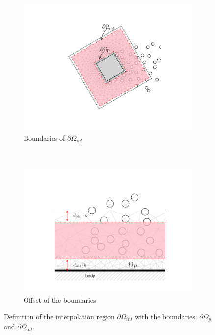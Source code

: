 	\begin{figure}[!b]
     \centering
     \begin{subfigure}[t]{0.35\textwidth}
             \includegraphics[trim=4.37cm 1.58cm 3.86cm 1.58cm, clip, width=\linewidth]{./figures/hybrid/interpolation/interpRegion.pdf}
             \caption{Boundaries of $\partial \Omega_{int}$}
             \label{fig:interpRegion}
     \end{subfigure}%
     ~ %
     \begin{subfigure}[t]{0.6\textwidth}
             \includegraphics[width=\linewidth]{./figures/hybrid/interpolation/hybrid_domains_withInterpReg.pdf}
             \caption{Offset of the boundaries}
             \label{fig:hybrid_domains_withInterpReg}
     \end{subfigure}

     \caption{Definition of the interpolation region $\partial \Omega_{int}$ with the boundaries: $\partial \Omega_p$ and $\partial \Omega_{int}$.}
     \label{fig:interpolationRegionDefinitions}
	\end{figure}	

